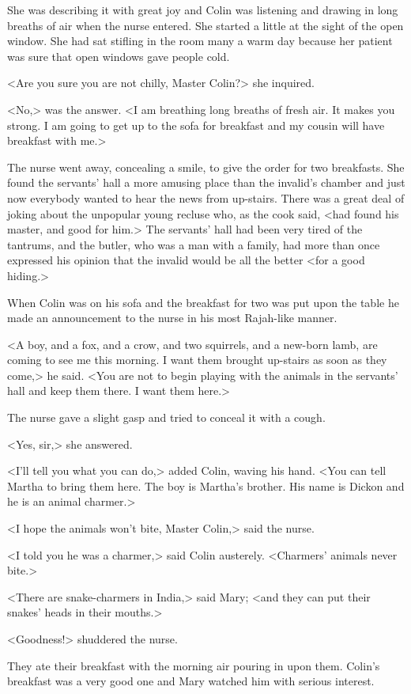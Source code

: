 She was describing it with great joy and Colin was listening and drawing in long breaths of air when the nurse entered. She started a little at the sight of the open window. She had sat stifling in the room many a warm day because her patient was sure that open windows gave people cold.

<Are you sure you are not chilly, Master Colin?> she inquired.

<No,> was the answer. <I am breathing long breaths of fresh air. It makes you strong. I am going to get up to the sofa for breakfast and my cousin will have breakfast with me.>

The nurse went away, concealing a smile, to give the order for two breakfasts. She found the servants' hall a more amusing place than the invalid's chamber and just now everybody wanted to hear the news from up-stairs. There was a great deal of joking about the unpopular young recluse who, as the cook said, <had found his master, and good for him.> The servants' hall had been very tired of the tantrums, and the butler, who was a man with a family, had more than once expressed his opinion that the invalid would be all the better <for a good hiding.>

When Colin was on his sofa and the breakfast for two was put upon the table he made an announcement to the nurse in his most Rajah-like manner.

<A boy, and a fox, and a crow, and two squirrels, and a new-born lamb, are coming to see me this morning. I want them brought up-stairs as soon as they come,> he said. <You are not to begin playing with the animals in the servants' hall and keep them there. I want them here.>

The nurse gave a slight gasp and tried to conceal it with a cough.

<Yes, sir,> she answered.

<I'll tell you what you can do,> added Colin, waving his hand. <You can tell Martha to bring them here. The boy is Martha's brother. His name is Dickon and he is an animal charmer.>

<I hope the animals won't bite, Master Colin,> said the nurse.

<I told you he was a charmer,> said Colin austerely. <Charmers' animals never bite.>

<There are snake-charmers in India,> said Mary; <and they can put their snakes' heads in their mouths.>

<Goodness!> shuddered the nurse.

They ate their breakfast with the morning air pouring in upon them. Colin's breakfast was a very good one and Mary watched him with serious interest.

